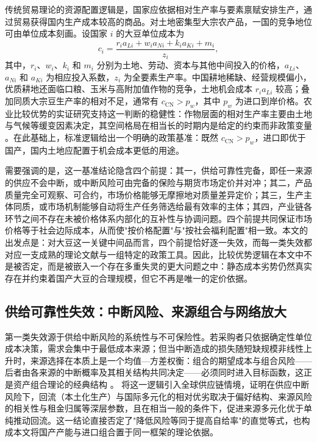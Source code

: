 \documentclass[UTF8,zihao=-4,fontset=fandol]{ctexart}
\numberwithin{equation}{section}
\theoremstyle{definition}
\theoremstyle{remark}
\begin{document}
传统贸易理论的资源配置逻辑是，国家应依据相对生产率与要素禀赋安排生产，通过贸易获得国内生产成本较高的商品。对土地密集型大宗农产品，一国的竞争地位可由单位成本刻画。设国家 $i$ 的大豆单位成本为
\begin{equation}
 c_i=\frac{r_i a_{Li}+w_i a_{Ni}+k_i a_{Ki}+m_i}{z_i},
 \label{eq:unitcost}
\end{equation}
其中，$r_i$、$w_i$、$k_i$ 和 $m_i$ 分别为土地、劳动、资本与其他中间投入的价格，$a_{Li}$、$a_{Ni}$ 和 $a_{Ki}$ 为相应投入系数，$z_i$ 为全要素生产率。中国耕地稀缺、经营规模偏小，优质耕地还面临口粮、玉米与高附加值作物的竞争，土地机会成本 $r_ia_{Li}$ 较高；叠加同质大宗豆生产率的相对不足，通常有 $c_{\mathrm{CN}}>p_w$，其中 $p_w$ 为进口到岸价格。农业比较优势的实证研究支持这一判断的稳健性：作物层面的相对生产率主要由土地与气候等缓变因素决定，其空间格局在相当长的时期内是给定的约束而非政策变量 \parencite{CostinotDonaldsonSmith2016}。在此基础上，标准逻辑给出一个明确的政策基准：既然 $c_{\mathrm{CN}}>p_w$，进口即优于国产，国内土地应配置于机会成本更低的用途。

需要强调的是，这一基准结论隐含四个前提：其一，供给可靠性完备，即任一来源的供应不会中断，或中断风险可由完备的保险与期货市场定价并对冲；其二，产品质量完全可观察、可合约，市场价格能够无摩擦地对质量差异定价；其三，生产主体同质，或市场机制能够自动将生产任务筛选给最有效率的主体；其四，产业链各环节之间不存在未被价格体系内部化的互补性与协调问题。四个前提共同保证市场价格等于社会边际成本，从而使"按价格配置"与"按社会福利配置"相一致。本文的出发点是：对大豆这一关键中间品而言，四个前提恰好逐一失效，而每一类失效都对应一支成熟的理论文献与一组特定的政策工具。因此，比较优势逻辑在本文中不是被否定，而是被嵌入一个存在多重失灵的更大问题之中：静态成本劣势仍然真实存在并约束着国产大豆的合理规模，但它不再是唯一的定价依据。

\subsection{供给可靠性失效：中断风险、来源组合与网络放大}

第一类失效源于供给中断风险的系统性与不可保险性。若采购者只依据确定性单位成本决策，需求会集中于最低成本来源；但当中断造成的损失随短缺规模非线性上升时，来源选择在本质上是一个均值—方差权衡：组合的期望成本与组合风险——后者由各来源的中断概率及其相关结构共同决定——必须同时进入目标函数，这正是资产组合理论的经典结构 \parencite{Markowitz1952}。\textcite{GrossmanHelpmanLhuillier2023} 将这一逻辑引入全球供应链情境，证明在供应中断风险下，回流（本土化生产）与国际多元化的相对优劣取决于偏好结构、来源风险的相关性与租金归属等深层参数，且在相当一般的条件下，促进来源多元化优于单纯推动回流。这一结论直接否定了"降低风险等同于提高自给率"的直觉等式，也构成本文将国产产能与进口组合置于同一框架的理论依据。
\end{document}
